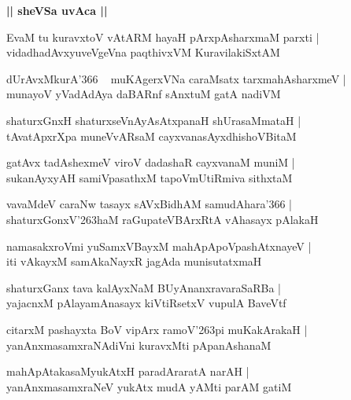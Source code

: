 \documentclass[twoside,12pt,openright]{book}
\def\S{\char'263}
\newcounter{shloka}[chapter]
\def\uvaca#1{\centerline{{\large\textbf{#1}}}}
\begin{document}
\uvaca{|| sheVSa uvAca ||}

\begin{shloka}%
EvaM tu kuravxtoV vAtARM hayaH pArxpAsharxmaM parxti |\\
vidadhadAvxyuveVgeVna paqthivxVM KuravilakiSxtAM 
\end{shloka}

\begin{shloka}%
dUrAvxMkurA\char'366 ~ muKAgerxVNa caraMsatx tarxmahAsharxmeV |\\
munayoV yVadAdAya daBARnf sAnxtuM gatA nadiVM 
\end{shloka}

\begin{shloka}%
shaturxGnxH shaturxseVnAyAsAtxpanaH shUrasaMmataH |\\
tAvatApxrXpa muneVvARsaM cayxvanasAyxdhishoVBitaM 
\end{shloka}

\begin{shloka}%
gatAvx tadAshexmeV viroV dadashaR cayxvanaM muniM |\\
sukanAyxyAH samiVpasathxM  tapoVmUtiRmiva sithxtaM 
\end{shloka}

\begin{shloka}%
vavaMdeV caraNw tasayx sAVxBidhAM samudAhara\char'366 |\\
shaturxGonxV\S haM raGupateVBArxRtA vAhasayx pAlakaH
\end{shloka}

\begin{shloka}%
namasakxroVmi yuSamxVBayxM mahApApoVpashAtxnayeV |\\
iti vAkayxM samAkaNayxR jagAda munisutatxmaH 
\end{shloka}

\begin{shloka}%
shaturxGanx tava kalAyxNaM BUyAnanxravaraSaRBa |\\
yajacnxM pAlayamAnasayx kiVtiRsetxV vupulA BaveVtf
\end{shloka}

\begin{shloka}%
citarxM pashayxta BoV vipArx ramoV\S pi muKakArakaH |\\
yanAnxmasamxraNAdiVni kuravxMti pApanAshanaM 
\end{shloka}

\begin{shloka}%
mahApAtakasaMyukAtxH paradAraratA narAH |\\
yanAnxmasamxraNeV yukAtx mudA yAMti parAM gatiM 
\end{shloka}
\end{document}
